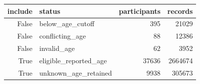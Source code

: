 \begin{tabular}{rlrr}
\toprule
include & status & participants & records \\
\midrule
False & below_age_cutoff & 395 & 21029 \\
False & conflicting_age & 88 & 12386 \\
False & invalid_age & 62 & 3952 \\
True & eligible_reported_age & 37636 & 2664674 \\
True & unknown_age_retained & 9938 & 305673 \\
\bottomrule
\end{tabular}
